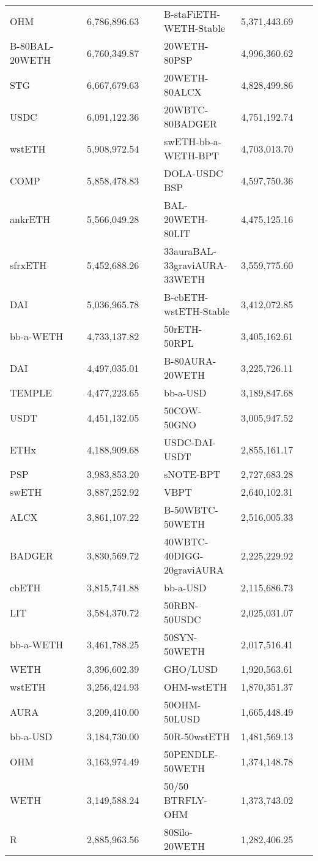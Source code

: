 \begin{longtable}{@{}p{0.25\linewidth}p{0.25\linewidth}p{0.25\linewidth}p{0.25\linewidth}@{}}
OHM & 6,786,896.63 & B-staFiETH-WETH-Stable &5,371,443.69 \\
B-80BAL-20WETH & 6,760,349.87 & 20WETH-80PSP &4,996,360.62 \\
STG & 6,667,679.63 & 20WETH-80ALCX &4,828,499.86 \\
USDC & 6,091,122.36 & 20WBTC-80BADGER &4,751,192.74 \\
wstETH & 5,908,972.54 & swETH-bb-a-WETH-BPT &4,703,013.70 \\
COMP & 5,858,478.83 & DOLA-USDC BSP &4,597,750.36 \\
ankrETH & 5,566,049.28 & BAL-20WETH-80LIT &4,475,125.16 \\
sfrxETH & 5,452,688.26 & 33auraBAL-33graviAURA-33WETH &3,559,775.60 \\
DAI & 5,036,965.78 & B-cbETH-wstETH-Stable &3,412,072.85 \\
bb-a-WETH & 4,733,137.82 & 50rETH-50RPL &3,405,162.61 \\
DAI & 4,497,035.01 & B-80AURA-20WETH &3,225,726.11 \\
TEMPLE & 4,477,223.65 & bb-a-USD &3,189,847.68 \\
USDT & 4,451,132.05 & 50COW-50GNO &3,005,947.52 \\
ETHx & 4,188,909.68 & USDC-DAI-USDT &2,855,161.17 \\
PSP & 3,983,853.20 & sNOTE-BPT &2,727,683.28 \\
swETH & 3,887,252.92 & VBPT &2,640,102.31 \\
ALCX & 3,861,107.22 & B-50WBTC-50WETH &2,516,005.33 \\
BADGER & 3,830,569.72 & 40WBTC-40DIGG-20graviAURA &2,225,229.92 \\
cbETH & 3,815,741.88 & bb-a-USD &2,115,686.73 \\
LIT & 3,584,370.72 & 50RBN-50USDC &2,025,031.07 \\
bb-a-WETH & 3,461,788.25 & 50SYN-50WETH &2,017,516.41 \\
WETH & 3,396,602.39 & GHO/LUSD &1,920,563.61 \\
wstETH & 3,256,424.93 & OHM-wstETH &1,870,351.37 \\
AURA & 3,209,410.00 & 50OHM-50LUSD &1,665,448.49 \\
bb-a-USD & 3,184,730.00 & 50R-50wstETH &1,481,569.13 \\
OHM & 3,163,974.49 & 50PENDLE-50WETH &1,374,148.78 \\
WETH & 3,149,588.24 & 50/50 BTRFLY-OHM &1,373,743.02 \\
R & 2,885,963.56 & 80Silo-20WETH &1,282,406.25 \\

\end{longtable}
